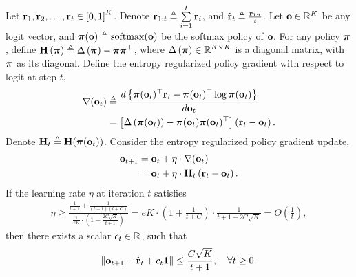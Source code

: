 \begin{lem}
Let ${\mathbf{r}}_1, {\mathbf{r}}_2, \dots, {\mathbf{r}}_t \in \left[ 0, 1  \right]^K$. Denote ${\mathbf{r}}_{1:t} \triangleq \sum\limits_{i=1}^{t}{{\mathbf{r}}_i}$, and $\hat{{\mathbf{r}}}_t \triangleq \frac{{\mathbf{r}}_{1:t}}{t}$. Let ${\mathbf{o}} \in {\mathbb{R}}^K$ be any logit vector, and ${\boldsymbol{\pi}}({\mathbf{o}}) \triangleq \mathrm{softmax}({\mathbf{o}})$ be the softmax policy of ${\mathbf{o}}$. For any policy ${\boldsymbol{\pi}}$, define ${\mathbf{H}}\left( {\boldsymbol{\pi}} \right) \triangleq \Delta \left( {\boldsymbol{\pi}} \right) - {\boldsymbol{\pi}} {\boldsymbol{\pi}}^\top$, where $\Delta \left( {\boldsymbol{\pi}} \right) \in {\mathbb{R}}^{K \times K}$ is a diagonal matrix, with ${\boldsymbol{\pi}}$ as its diagonal. Define the entropy regularized policy gradient with respect to logit at step $t$,
\begin{equation*}
\begin{split}
    \nabla({\mathbf{o}}_t) &\triangleq \frac{d \left\{ {\boldsymbol{\pi}}({\mathbf{o}}_t)^\top {\mathbf{r}}_t - {\boldsymbol{\pi}}({\mathbf{o}}_t)^\top \log{{\boldsymbol{\pi}}({\mathbf{o}}_t)} \right\} }{d {\mathbf{o}}_t} \\
    &= \left[ \Delta \left( {\boldsymbol{\pi}}({\mathbf{o}}_t) \right) - {\boldsymbol{\pi}}({\mathbf{o}}_t) {\boldsymbol{\pi}}({\mathbf{o}}_t)^\top \right] \left( {\mathbf{r}}_t - {\mathbf{o}}_t \right).
\end{split}
\end{equation*}
Denote ${\mathbf{H}}_t \triangleq {\mathbf{H}}({\boldsymbol{\pi}}({\mathbf{o}}_t))$.
Consider the entropy regularized policy gradient update,
\begin{equation*}
\begin{split}
    {\mathbf{o}}_{t+1} &= {\mathbf{o}}_t + \eta \cdot \nabla({\mathbf{o}}_t) \\
    &= {\mathbf{o}}_t + \eta \cdot {\mathbf{H}}_t \left( {\mathbf{r}}_t - {\mathbf{o}}_t \right).
\end{split}
\end{equation*}
If the learning rate $\eta$ at iteration $t$ satisfies
\begin{equation*}
\begin{split}
    \eta \ge \frac{ \frac{1}{t+1} + \frac{1}{(t+1)(t+C)} }{ \frac{1}{e K} \cdot \left( 1 - \frac{2 C \sqrt{K}}{t+1} \right)  } = e K \cdot \left( 1 + \frac{1}{t+C} \right) \cdot \frac{1}{t+1-2C\sqrt{K}} = O\left( \frac{1}{t} \right),
\end{split}
\end{equation*}
then there exists a scalar $c_t \in {\mathbb{R}}$, such that
\begin{equation*}
    \left\| {\mathbf{o}}_{t+1} - \hat{{\mathbf{r}}}_{t} + c_t {\mathbf{1}} \right\| \le \frac{C \sqrt{K}}{t+1}, \quad \forall t \ge 0.
\end{equation*}
\end{lem}
